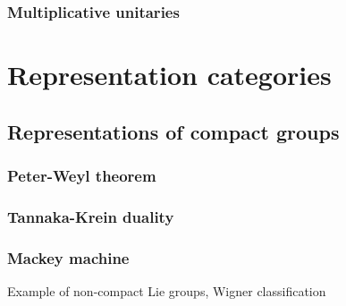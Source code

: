 \documentclass{../../large}
\begin{document}
\section{Multiplicative unitaries}










\part{Representation categories}


\chapter{Representations of compact groups}
\section{Peter-Weyl theorem}
\section{Tannaka-Krein duality}
\section{Mackey machine}
Example of non-compact Lie groups,
Wigner classification
\end{document}
